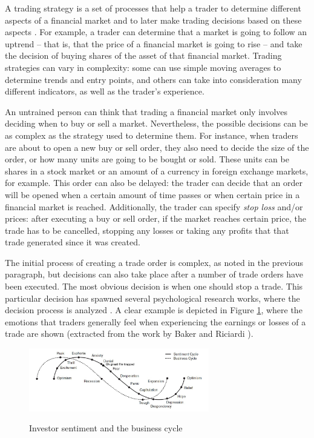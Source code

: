 A trading strategy is a set of processes that help a trader to determine
different aspects of a financial market and to later make trading decisions
based on these aspects \cite{Kendall2003}. For example, a trader can determine
that a market is going to follow an uptrend -- that is, that the price of a
financial market is going to rise -- and take the decision of buying shares of
the asset of that financial market. Trading strategies can vary in complexity:
some can use simple moving averages to determine trends and entry points, and
others can take into consideration many different indicators, as well as the
trader's experience.

An untrained person can think that trading a financial market only involves
deciding when to buy or sell a market. Nevertheless, the possible decisions can
be as complex as the strategy used to determine them. For instance, when traders
are about to open a new buy or sell order, they also need to decide the size of
the order, or how many units are going to be bought or sold. These units can be
shares in a stock market or an amount of a currency in foreign exchange markets,
for example. This order can also be delayed: the trader can decide that an order
will be opened when a certain amount of time passes or when certain price in a
financial market is reached. Additionally, the trader can specify \textit{stop
  loss} and/or  prices: after executing a buy or sell order,
if the market reaches certain price, the trade has to be cancelled, stopping any
losses or taking any profits that that trade generated since it was created.

The initial process of creating a trade order is complex, as noted in the
previous paragraph, but decisions can also take place after a number of trade
orders have been executed. The most obvious decision is when one should stop a
trade. This particular decision has spawned several psychological research
works, where the decision process is analyzed \cite{Maranon2018}. A clear
example is depicted in Figure \ref{figure:trading-psychology}, where the
emotions that traders generally feel when experiencing the earnings or losses of
a trade are shown (extracted from the work by Baker and Riciardi \cite{BakerHKentandRicciardi2014}).

\begin{figure}
\caption{Investor sentiment and the business cycle}
\centering
\includegraphics[width=0.7\textwidth]{img/trading-psychology.png}
\label{figure:trading-psychology}
\end{figure}

